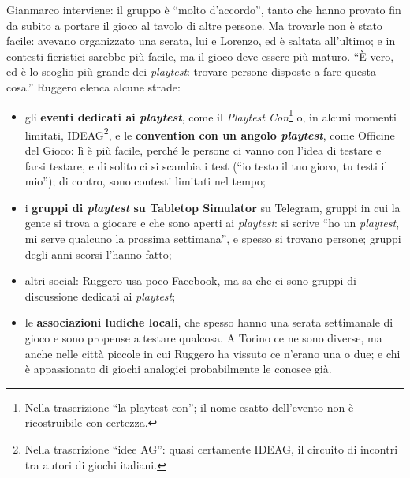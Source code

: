 Gianmarco interviene: il gruppo è ``molto d'accordo'', tanto che hanno provato fin da
subito a portare il gioco al tavolo di altre persone. Ma trovarle non è stato facile:
avevano organizzato una serata, lui e Lorenzo, ed è saltata all'ultimo; e in contesti
fieristici sarebbe più facile, ma il gioco deve essere più maturo. ``È vero, ed è lo
scoglio più grande dei \emph{playtest}: trovare persone disposte a fare questa cosa.''
Ruggero elenca alcune strade:
\begin{itemize}
  \item gli \textbf{eventi dedicati ai \emph{playtest}}, come il
        \emph{Playtest Con}\footnote{Nella trascrizione ``la playtest con''; il nome
        esatto dell'evento non è ricostruibile con certezza.} o, in alcuni momenti
        limitati, IDEAG\footnote{Nella trascrizione ``idee AG'': quasi certamente IDEAG, il
        circuito di incontri tra autori di giochi italiani.}, e le \textbf{convention con
        un angolo \emph{playtest}}, come Officine del Gioco: lì è più facile, perché le
        persone ci vanno con l'idea di testare e farsi testare, e di solito ci si scambia
        i test (``io testo il tuo gioco, tu testi il mio''); di contro, sono contesti
        limitati nel tempo;
  \item i \textbf{gruppi di \emph{playtest} su Tabletop Simulator} su Telegram, gruppi in
        cui la gente si trova a giocare e che sono aperti ai \emph{playtest}: si scrive
        ``ho un \emph{playtest}, mi serve qualcuno la prossima settimana'', e spesso si
        trovano persone; gruppi degli anni scorsi l'hanno fatto;
  \item altri social: Ruggero usa poco Facebook, ma sa che ci sono gruppi di discussione
        dedicati ai \emph{playtest};
  \item le \textbf{associazioni ludiche locali}, che spesso hanno una serata settimanale
        di gioco e sono propense a testare qualcosa. A Torino ce ne sono diverse, ma anche
        nelle città piccole in cui Ruggero ha vissuto ce n'erano una o due; e chi è
        appassionato di giochi analogici probabilmente le conosce già.
\end{itemize}

